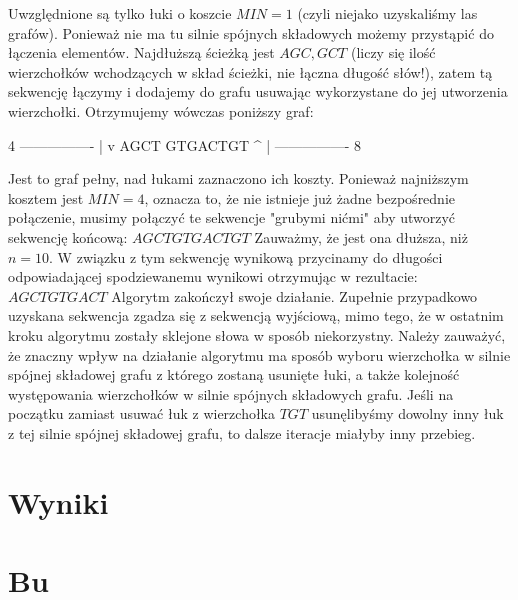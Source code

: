 \documentclass[a4paper]{article}
\begin{document}
Uwzględnione są tylko łuki o koszcie $MIN=1$ (czyli niejako uzyskaliśmy las grafów). Ponieważ nie ma tu silnie spójnych składowych możemy przystąpić do łączenia elementów. Najdłuższą ścieżką jest $AGC, GCT$ (liczy się ilość wierzchołków wchodzących w skład ścieżki, nie łączna długość słów!), zatem tą sekwencję łączymy i dodajemy do grafu usuwając wykorzystane do jej utworzenia wierzchołki.
Otrzymujemy wówczas poniższy graf:

         4
  ----------------
  |              v
AGCT          GTGACTGT
  ^              |
  ----------------
         8
		 
Jest to graf pełny, nad łukami zaznaczono ich koszty. Ponieważ najniższym kosztem jest $MIN=4$, oznacza to, że nie istnieje już żadne bezpośrednie połączenie, musimy połączyć te sekwencje "grubymi nićmi" aby utworzyć sekwencję końcową:
$AGCTGTGACTGT$
Zauważmy, że jest ona dłuższa, niż $n=10$. W związku z tym sekwencję wynikową przycinamy do długości odpowiadającej spodziewanemu wynikowi otrzymując w rezultacie:
$AGCTGTGACT$
Algorytm zakończył swoje działanie. Zupełnie przypadkowo uzyskana sekwencja zgadza się z sekwencją wyjściową, mimo tego, że w ostatnim kroku algorytmu zostały sklejone słowa w sposób niekorzystny.
Należy zauważyć, że znaczny wpływ na działanie algorytmu ma sposób wyboru wierzchołka w silnie spójnej składowej grafu z którego zostaną usunięte łuki, a także kolejność występowania wierzchołków w silnie spójnych składowych grafu. Jeśli na początku zamiast usuwać łuk z wierzchołka $TGT$ usunęlibyśmy dowolny inny łuk z tej silnie spójnej składowej grafu, to dalsze iteracje miałyby inny przebieg.


\section{Wyniki}

\section{Bu}
\end{document}
